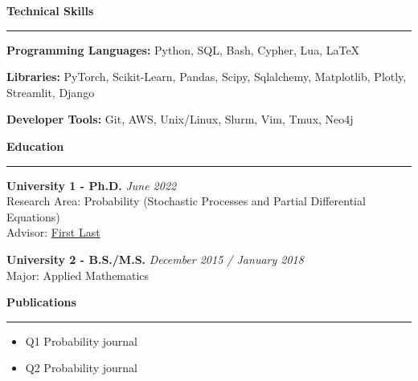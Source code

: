 \documentclass[11pt]{article}
\begin{document}
\vspace{.3em}
\textbf{\Large Technical Skills}
\vspace{.3em}
\hrule
\vspace{.3em}

\textbf{Programming Languages:}
Python, SQL, Bash, Cypher, Lua, \LaTeX

\textbf{Libraries:} 
PyTorch, Scikit-Learn, Pandas, Scipy, Sqlalchemy, Matplotlib, Plotly, Streamlit, Django
 

\textbf{Developer Tools:} Git, AWS, Unix/Linux, Slurm, Vim, Tmux, Neo4j


\vspace{.3em}
\textbf{\Large Education}
\vspace{.3em}
\hrule
\vspace{.3em}

\textbf{University 1 - Ph.D.} \hfill \textit{June 2022} \\
Research Area: Probability (Stochastic Processes and Partial Differential Equations) \\
Advisor: \href{http://}{First Last}

\textbf{University 2 - B.S./M.S.} 
\hfill \textit{December 2015 / January 2018} \\
Major: Applied Mathematics

\vspace{.3em}
\textbf{\Large Publications}
\vspace{.3em}
\hrule
\vspace{.3em}

\begin{itemize}[leftmargin=*]
  \item[1:] Q1 Probability journal

  \item[2:] Q2 Probability journal

\end{itemize}
\end{document}
